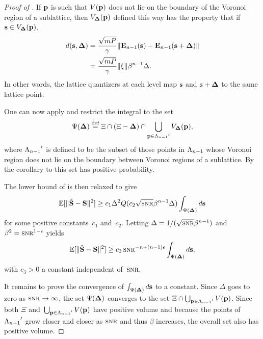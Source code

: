 \begin{subappendices}
\begin{proof}[Proof of ]
    If $\mathbf{p}$ is such that $V(\mathbf{p})$ does not lie on the boundary of the Voronoi
    region of a sublattice, then ${V_{\mathbf{\Delta}}}(\mathbf{p})$ defined this way has the property
    that if $\mathbf{s} \in {V_{\mathbf{\Delta}}}(\mathbf{p})$,
    \begin{align*}
      d(\mathbf{s},\mathbf{\Delta}) &= \frac{\sqrt{mP}}{\gamma} \| \mathbf{E}_{n-1}(\mathbf{s}) - \mathbf{E}_{n-1}(\mathbf{s} +
      \mathbf{\Delta}) \| \\
      &= \frac{\sqrt{mP}}{\gamma} \| \mathbf{\xi} \| \beta^{n-1} \Delta.
    \end{align*}
    In other words, the lattice quantizers at each level map $\mathbf{s}$ and $\mathbf{s} +
    \mathbf{\Delta}$ to the same lattice point.

    One can now apply  and restrict the integral to the set
    \[ \Psi(\mathbf{\Delta}) \stackrel{\text{def}}{=} \Xi \cap (\Xi - \mathbf{\Delta}) \cap \bigcup_{\mathbf{p} \in {\Lambda_{n-1}}'} {V_{\mathbf{\Delta}}}(\mathbf{p}),
    \]
    where ${\Lambda_{n-1}}'$ is defined to be the subset of those points in ${\Lambda_{n-1}}$ whose
    Voronoi region does not lie on the boundary between Voronoi regions of a
    sublattice. By the corollary to  this set has positive
    probability.

    The lower bound of  is then relaxed to give
    \begin{equation*}
      \msev \ge c_1 \Delta^2 Q(c_2 \sqrt{\snr} \beta^{n-1} \Delta) 
      \int_{\Psi(\Dv)} d\s
    \end{equation*}
    for some positive constants~$c_1$ and~$c_2$. Letting $\Delta =
    1/(\sqrt{\snr} \beta^{n-1})$ and $\beta^2 = \snr^{1-\e}$ yields
    \begin{equation*}
      \msev \ge c_3 \snr^{-n+(n-1)\e} \int_{\Psi(\Dv)} d\s,
    \end{equation*}
    with $c_3 > 0$ a constant independent of~$\snr$.

    It remains to prove the convergence of $\int_{\Psi(\mathbf{\Delta})} d\mathbf{s}$ to a constant.
    Since $\Delta$ goes to zero as $\snr \goesto \infty$, the set $\Psi(\mathbf{\Delta})$
    converges to the set $\Xi \cap \bigcup_{\mathbf{p} \in {\Lambda_{n-1}}'} V(\mathbf{p})$. Since both
    $\Xi$ and~$\bigcup_{\mathbf{p} \in {\Lambda_{n-1}}'} V(\mathbf{p})$ have positive volume and because the
    points of ${\Lambda_{n-1}}'$ grow closer and closer as $\snr$ and thus $\beta$
    increases, the overall set also has positive volume.
  \end{proof}



\end{subappendices}
